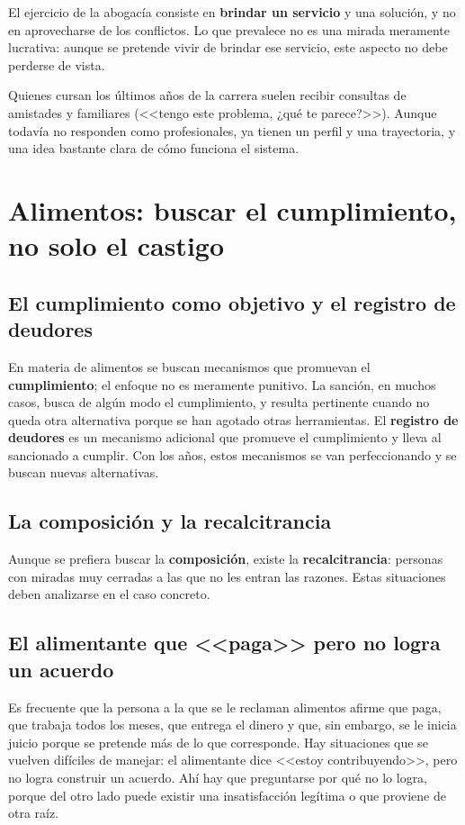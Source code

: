 \documentclass[12pt,oneside]{book}
\begin{document}
El ejercicio de la abogacía consiste en \textbf{brindar un servicio} y una solución, y no en aprovecharse de los conflictos. Lo que prevalece no es una mirada meramente lucrativa: aunque se pretende vivir de brindar ese servicio, este aspecto no debe perderse de vista.

Quienes cursan los últimos años de la carrera suelen recibir consultas de amistades y familiares (<<tengo este problema, ¿qué te parece?>>). Aunque todavía no responden como profesionales, ya tienen un perfil y una trayectoria, y una idea bastante clara de cómo funciona el sistema.

\section{Alimentos: buscar el cumplimiento, no solo el castigo}

\subsection{El cumplimiento como objetivo y el registro de deudores}

En materia de alimentos se buscan mecanismos que promuevan el \textbf{cumplimiento}; el enfoque no es meramente punitivo. La sanción, en muchos casos, busca de algún modo el cumplimiento, y resulta pertinente cuando no queda otra alternativa porque se han agotado otras herramientas. El \textbf{registro de deudores} es un mecanismo adicional que promueve el cumplimiento y lleva al sancionado a cumplir. Con los años, estos mecanismos se van perfeccionando y se buscan nuevas alternativas.

\subsection{La composición y la recalcitrancia}

Aunque se prefiera buscar la \textbf{composición}, existe la \textbf{recalcitrancia}: personas con miradas muy cerradas a las que no les entran las razones. Estas situaciones deben analizarse en el caso concreto.

\subsection{El alimentante que <<paga>> pero no logra un acuerdo}

Es frecuente que la persona a la que se le reclaman alimentos afirme que paga, que trabaja todos los meses, que entrega el dinero y que, sin embargo, se le inicia juicio porque se pretende más de lo que corresponde. Hay situaciones que se vuelven difíciles de manejar: el alimentante dice <<estoy contribuyendo>>, pero no logra construir un acuerdo. Ahí hay que preguntarse por qué no lo logra, porque del otro lado puede existir una insatisfacción legítima o que proviene de otra raíz.
\end{document}
